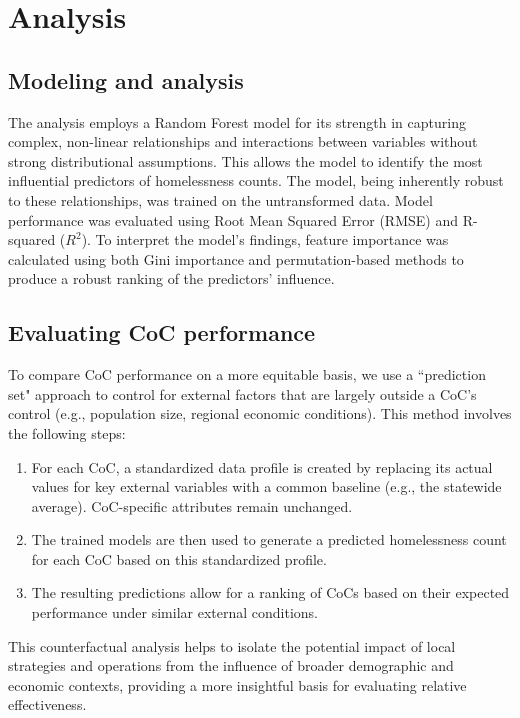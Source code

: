 \documentclass[12pt]{scrartcl}
\begin{document}
\section{Analysis}

\subsection{Modeling and analysis}
The analysis employs a Random Forest model for its strength in capturing complex, non-linear relationships and interactions between variables without strong distributional assumptions. This allows the model to identify the most influential predictors of homelessness counts. The model, being inherently robust to these relationships, was trained on the untransformed data. Model performance was evaluated using Root Mean Squared Error (RMSE) and R-squared ($R^2$). To interpret the model's findings, feature importance was calculated using both Gini importance and permutation-based methods to produce a robust ranking of the predictors' influence.

\subsection{Evaluating CoC performance}
To compare CoC performance on a more equitable basis, we use a ``prediction set" approach to control for external factors that are largely outside a CoC's control (e.g., population size, regional economic conditions). This method involves the following steps:
\begin{enumerate}
    \item For each CoC, a standardized data profile is created by replacing its actual values for key external variables with a common baseline (e.g., the statewide average). CoC-specific attributes remain unchanged.
    \item The trained models are then used to generate a predicted homelessness count for each CoC based on this standardized profile.
    \item The resulting predictions allow for a ranking of CoCs based on their expected performance under similar external conditions.
\end{enumerate}
This counterfactual analysis helps to isolate the potential impact of local strategies and operations from the influence of broader demographic and economic contexts, providing a more insightful basis for evaluating relative effectiveness.

\end{document}
